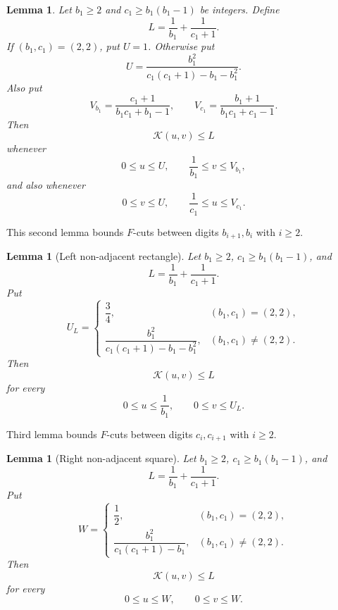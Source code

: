 \documentclass[11pt]{amsart}
\newtheorem{lemma}[theorem]{Lemma}
\newcommand{\Kfun}{\mathcal K}
\begin{document}
\begin{lemma}\label{lem:arithmetic-bound}
Let $b_1\ge2$ and $c_1\geq b_1(b_1-1)$ be integers.  Define
$$
        L=\frac{1}{b_1}+\frac1{c_1+1}.
$$
If $(b_1,c_1)=(2,2)$, put $U=1$.  Otherwise put
$$
        U=\frac{b_1^2}{c_1(c_1+1)-b_1-b_1^2}.
$$
Also put
$$
        V_{b_1}=\frac{c_1+1}{b_1c_1+b_1-1},
        \qquad
        V_{c_1}=\frac{b_1+1}{b_1c_1+c_1-1}.
$$
Then
\begin{equation}\label{eq:arithmetic-main}
        \Kfun(u,v)\le L
\end{equation}
whenever
\begin{equation}\label{eq:arithmetic-first-range}
        0\le u\le U,
        \qquad
        \frac{1}{b_1}\le v\le V_{b_1},
\end{equation}
and also whenever
\begin{equation}\label{eq:arithmetic-second-range}
        0\le v\le U,
        \qquad
        \frac{1}{c_1}\le u\le V_{c_1}.
\end{equation}
\end{lemma}



This second lemma bounds $F$-cuts between digits $b_{i+1},b_i$ with $i\geq2$.

\begin{lemma}[Left non-adjacent rectangle]\label{lem:left-rectangle}
Let $b_1\ge2$, $c_1\geq b_1(b_1-1)$, and
$$
        L=\frac{1}{b_1}+\frac1{c_1+1}.
$$
Put
$$
        U_L=
        \begin{cases}
        \dfrac34, & (b_1,c_1)=(2,2),\\[6pt]
        \dfrac{b_1^2}{c_1(c_1+1)-b_1-b_1^2}, & (b_1,c_1)\ne(2,2).
        \end{cases}
$$
Then
$$
        \Kfun(u,v)\le L
$$
for every
$$
        0\le u\le \frac{1}{b_1},
        \qquad
        0\le v\le U_L .
$$
\end{lemma}

Third lemma bounds $F$-cuts between digits $c_i,c_{i+1}$ with $i\geq2$.

\begin{lemma}[Right non-adjacent square]\label{lem:right-square}
Let $b_1\ge2$, $c_1\geq b_1(b_1-1)$, and
$$
        L=\frac{1}{b_1}+\frac1{c_1+1}.
$$
Put
$$
        W=
        \begin{cases}
        \dfrac12, & (b_1,c_1)=(2,2),\\[6pt]
        \dfrac{b_1^2}{c_1(c_1+1)-b_1}, & (b_1,c_1)\ne(2,2).
        \end{cases}
$$
Then
$$
        \Kfun(u,v)\le L
$$
for every
$$
        0\le u\le W,
        \qquad
        0\le v\le W .
$$
\end{lemma}
\end{document}
